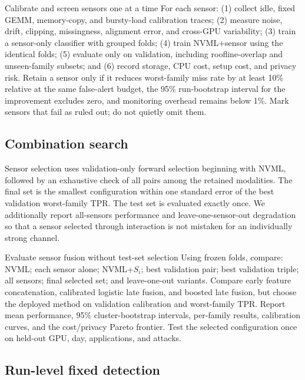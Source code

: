 \documentclass[sigplan,anonymous,review,nonacm]{acmart}
\begin{document}
\begin{experimentbox}{Calibrate and screen sensors one at a time}
For each sensor: (1) collect idle, fixed GEMM, memory-copy, and bursty-load calibration traces; (2) measure noise, drift, clipping, missingness, alignment error, and cross-GPU variability; (3) train a sensor-only classifier with grouped folds; (4) train NVML+sensor using the identical folds; (5) evaluate only on validation, including roofline-overlap and unseen-family subsets; and (6) record storage, CPU cost, setup cost, and privacy risk. Retain a sensor only if it reduces worst-family miss rate by at least 10\% relative at the same false-alert budget, the 95\% run-bootstrap interval for the improvement excludes zero, and monitoring overhead remains below 1\%. Mark sensors that fail as ruled out; do not quietly omit them.
\end{experimentbox}

\subsection{Combination search}

Sensor selection uses validation-only forward selection beginning with NVML, followed by an exhaustive check of all pairs among the retained modalities. The final set is the smallest configuration within one standard error of the best validation worst-family TPR. The test set is evaluated exactly once. We additionally report all-sensors performance and leave-one-sensor-out degradation so that a sensor selected through interaction is not mistaken for an individually strong channel.

\begin{experimentbox}{Evaluate sensor fusion without test-set selection}
Using frozen folds, compare: NVML; each sensor alone; NVML+$S_i$; best validation pair; best validation triple; all sensors; final selected set; and leave-one-out variants. Compare early feature concatenation, calibrated logistic late fusion, and boosted late fusion, but choose the deployed method on validation calibration and worst-family TPR. Report mean performance, 95\% cluster-bootstrap intervals, per-family results, calibration curves, and the cost/privacy Pareto frontier. Test the selected configuration once on held-out GPU, day, applications, and attacks.
\end{experimentbox}

\subsection{Run-level fixed detection}
\end{document}
